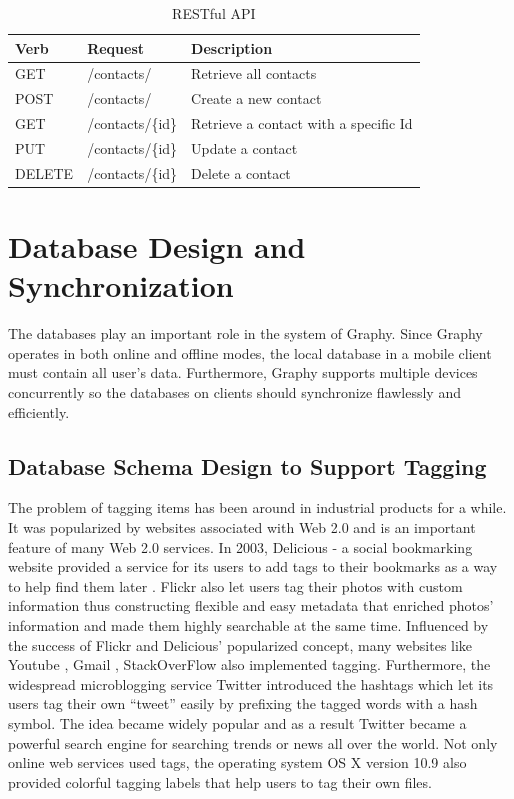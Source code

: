 \begin{table}[!ht]
\centering
\caption{RESTful API}\label{tb:restapi}
\begin{tabular}{| l | l | p{3.5cm} |} \hline
\textbf{Verb} & \textbf{Request} & \textbf{Description}\\ \hline
GET & /contacts/ & Retrieve all contacts\\ \hline
POST & /contacts/ & Create a new contact\\ \hline
GET & /contacts/\{id\} & Retrieve a contact with a specific Id\\ \hline
PUT & /contacts/\{id\} & Update a contact\\ \hline
DELETE & /contacts/\{id\} & Delete a contact\\ \hline
\end{tabular}
\end{table}

\section{Database Design and Synchronization}
The databases play an important role in the system of Graphy. Since Graphy operates in both online and offline modes, the local database in a mobile client must contain all user's data. Furthermore, Graphy supports multiple devices concurrently so the databases on clients should synchronize flawlessly and efficiently.

\subsection{Database Schema Design to Support Tagging}\label{databasedesign}
The problem of tagging items has been around in industrial products for a while. It was popularized by websites associated with Web 2.0 and is an important feature of many Web 2.0 services. In 2003, Delicious - a social bookmarking website provided a service for its users to add tags to their bookmarks as a way to help find them later \cite{delicious}. Flickr \cite{flickr} also let users tag their photos with custom information thus constructing flexible and easy metadata that enriched photos' information and made them highly searchable at the same time. Influenced by the success of Flickr and Delicious' popularized concept, many websites like Youtube \cite{youtube}, Gmail \cite{gmail}, StackOverFlow \cite{stackoverflow} also implemented tagging. Furthermore, the widespread microblogging service Twitter \cite{twitter} introduced the hashtags which let its users tag their own ``tweet'' easily by prefixing the tagged words with a hash symbol. The idea became widely popular and as a result Twitter became a powerful search engine for searching trends or news all over the world. Not only online web services used tags, the operating system OS X version 10.9 also provided colorful tagging labels \cite{osxtag} that help users to tag their own files.

